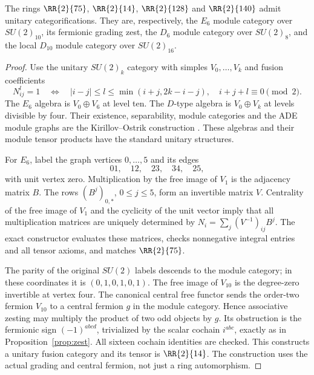 \begin{proposition}\label{prop:ADEmodels}
The rings $\RR{2}{75}$, $\RR{2}{14}$, $\RR{2}{128}$ and $\RR{2}{140}$
admit unitary categorifications. They are, respectively, the $E_6$ module
category over $SU(2)_{10}$, its fermionic grading zest, the $D_6$ module
category over $SU(2)_8$, and the local $D_{10}$ module category over
$SU(2)_{16}$.
\end{proposition}
\begin{proof}
Use the unitary $SU(2)_k$ category with simples $V_0,\ldots,V_k$ and
fusion coefficients
\[
 N_{ij}^l=1\quad\Longleftrightarrow\quad
 |i-j|\le l\le\min(i+j,2k-i-j),\quad i+j+l\equiv0\pmod2.
\]
The $E_6$ algebra is $V_0\oplus V_6$ at level ten. The $D$-type algebra
is $V_0\oplus V_k$ at levels divisible by four. Their existence,
separability, module categories and the ADE module graphs are the
Kirillov--Ostrik construction \cite[Theorem~6.1 and Section~7]{KO}.
These algebras and their module tensor products have the standard
unitary structures.

For $E_6$, label the graph vertices $0,\ldots,5$ and its edges
\[
 01,\quad12,\quad23,\quad34,\quad25,
\]
with unit vertex zero. Multiplication by the free image of $V_1$ is the
adjacency matrix $B$. The rows $(B^j)_{0,*}$, $0\le j\le5$, form an
invertible matrix $V$. Centrality of the free image of $V_1$ and the
cyclicity of the unit vector imply that all multiplication matrices are
uniquely determined by
$N_i=\sum_j(V^{-1})_{ij}B^j$. The exact constructor evaluates these
matrices, checks nonnegative integral entries and all tensor axioms,
and matches $\RR{2}{75}$.

The parity of the original $SU(2)$ labels descends to the module category;
in these coordinates it is $(0,1,0,1,0,1)$. The free image of $V_{10}$
is the degree-zero invertible at vertex four. The canonical central
free functor sends the order-two fermion $V_{10}$ to a central fermion
$g$ in the module category. Hence associative zesting may multiply the
product of two odd objects by $g$. Its obstruction is the fermionic
sign $(-1)^{abcd}$, trivialized by the scalar cochain $i^{abc}$, exactly
as in Proposition~\ref{prop:zest}. All sixteen cochain identities are
checked. This constructs a unitary fusion category and its tensor is
$\RR{2}{14}$. The construction uses the actual grading and central
fermion, not just a ring automorphism.


\end{proof}
